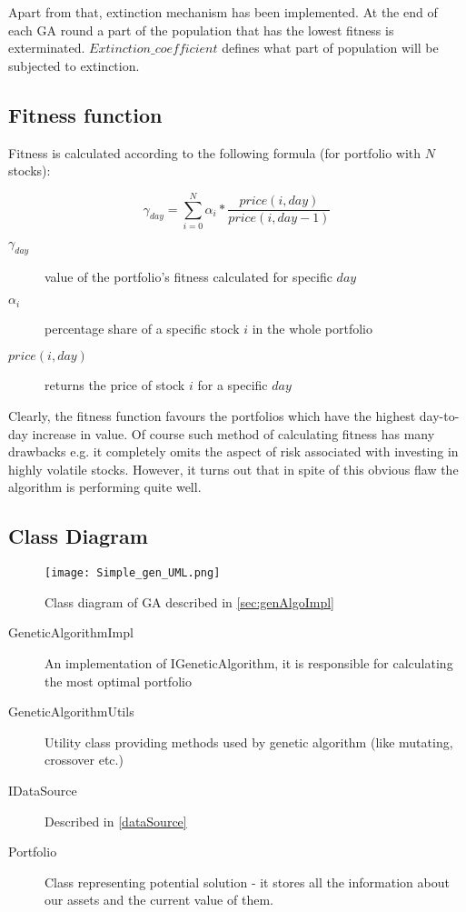 Apart from that, extinction mechanism has been implemented.
At the end of each GA round a part of the population that has the lowest fitness is exterminated.
$Extinction\_coefficient$ defines what part of population will be subjected to extinction.
 
\subsection{Fitness function}

Fitness is calculated according to the following formula (for portfolio with $N$ stocks):

\begin{equation}
    \gamma_{day} =  \sum_{i=0}^{N} {  \alpha_{i} * \frac{price(i,day)}{price(i,day - 1)} }
\end{equation}

\begin{description}
  \item [$\gamma_{day}$] 
      value of the portfolio's fitness calculated for specific $day$
  \item [$\alpha_{i}$]
      percentage share of a specific stock $i$ in the whole portfolio
  \item [$price(i,day)$]
      returns the price of stock $i$ for a specific $day$
\end{description}

Clearly, the fitness function favours the portfolios which have the highest day-to-day increase in value.
Of course such method of calculating fitness has many drawbacks e.g. it completely omits the aspect of risk associated with investing in highly volatile stocks.
However, it turns out that in spite of this obvious flaw the algorithm is performing quite well.  

\subsection{Class Diagram}
\label{gen-class-diagram}

\begin{figure}[H]   
	    \begin{center}
	      \texttt{[image: Simple\_gen\_UML.png]}
	    \end{center}
	    \caption{Class diagram of GA described in \ref{sec:genAlgoImpl}} 
	  \end{figure}

\begin{description}
  \item [GeneticAlgorithmImpl]
    An implementation of IGeneticAlgorithm, it is responsible for calculating the most optimal portfolio
  \item [GeneticAlgorithmUtils]
    Utility class providing methods used by genetic algorithm (like mutating, crossover etc.)
  \item [IDataSource]
    Described in \ref{dataSource}
  \item [Portfolio]
    Class representing potential solution - it stores all the information about our assets and the current value of them.

\end{description}

